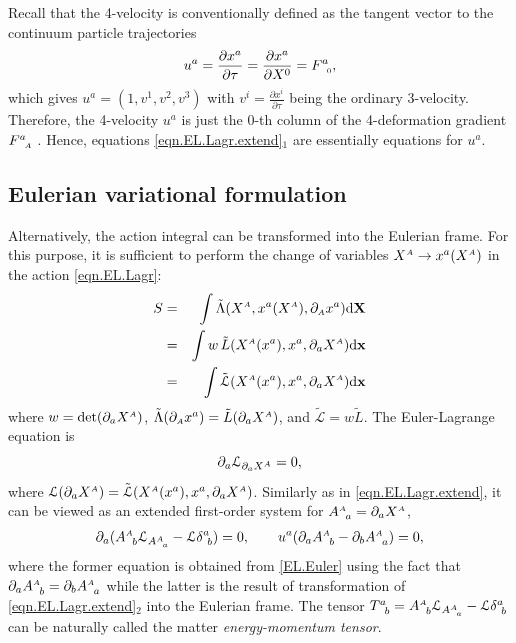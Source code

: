 \documentclass[
10pt, %
a4paper, %
oneside, %
headinclude,footinclude, %
BCOR5mm, %
]{scrartcl}
\newcommand{\xx}{\mathbf{x}}
\newcommand{\XX}{\mathbf{X}}
\newcommand{\dX}{\mathrm{d}\XX}
\newcommand{\dx}{\mathrm{d}\xx}
\newcommand{\sA}{{\mathsmaller A}}
\newcommand{\pd}{\partial}
\newcommand{\F}[2]{F^{#1}_{\ \, \mathsmaller#2}}
\newcommand{\A}[2]{A^{\mathsmaller#1}_{\ \, #2}}
\begin{document}
Recall that the 4-velocity is conventionally defined as the tangent vector to the continuum 
particle trajectories
\begin{equation}
    u^a = \frac{\pd x^a}{\pd \tau} = \frac{\pd x^a}{\pd X^0}  = \F{a}{0},
\end{equation}
which gives $ u^a = (1,v^1,v^2,v^3) $ with $ v^i = \frac{\pd x^i}{\pd \tau} $ being the ordinary 
3-velocity. Therefore, the 4-velocity $ u^a $ is just the $ 0 $-th column of the 4-deformation 
gradient $ \F{a}{\sA} $ \cite{PRD-Torsion2019}. Hence, equations 
\eqref{eqn.EL.Lagr.extend}$ _1 $ are essentially equations for $ u^a $.


\subsection{Eulerian variational formulation}\label{sec.variation.Euler}
Alternatively, the action integral can be transformed into the Eulerian frame. For 
this purpose, it is sufficient to perform the change of variables $ X^\sA \rightarrow 
x^a(X^\sA) $ 
in the action \eqref{eqn.EL.Lagr}:
\begin{eqnarray}\label{eq.Action.transform}
S &=& \int \tilde{\Lambda}(X^\sA,x^a(X^\sA),\pd_\sA x^a)\dX \nonumber\\
  &=& \int w \, \tilde{L}(X^\sA(x^a),x^a,\pd_a X^\sA)\dx \nonumber\\
  &=& \int \tilde{\mathcal{L}}(X^\sA(x^a),x^a,\pd_a X^\sA)\dx
\end{eqnarray}
where $ w = \det(\pd_a X^\sA) $, $ \tilde{\Lambda}(\pd_\sA x^a) = \tilde{L}(\pd_a X^\sA) $, and $ 
\tilde{\mathcal{L}} = w \tilde{L} $. The Euler-Lagrange 
equation is
\begin{equation}\label{EL.Euler}
\pd_a \mathcal{L}_{\pd_a X^\sA} = 0,
\end{equation}
where $ \mathcal{L}(\pd_a X^\sA) = \tilde{\mathcal{L}}(X^\sA(x^a),x^a,\pd_a X^\sA) $.
Similarly as in \eqref{eqn.EL.Lagr.extend}, it can be viewed as an extended first-order system for $ 
\A{A}{a} = \pd_a X^\sA $,
\begin{equation}\label{Euler.A}
\pd_a (\A{A}{b}\mathcal{L}_{\A{A}{a}} - \mathcal{L}\delta^a_{\ b}) = 0, \qquad u^a(\pd_a \A{A}{b} - 
\pd_b \A{A}{a}) = 0,
\end{equation}
where the former equation is obtained from \eqref{EL.Euler} using the fact that $ \pd_a\A{A}{b} = 
\pd_b \A{A}{a} $ while the 
latter is the result of transformation of \eqref{eqn.EL.Lagr.extend}$ _2 $ into the 
Eulerian frame. The tensor $ T^a_{\ \,b} = \A{A}{b}\mathcal{L}_{\A{A}{a}} - \mathcal{L}\delta^a_{\ 
b} 
$ can be naturally called the matter \textit{energy-momentum tensor}.
\end{document}
